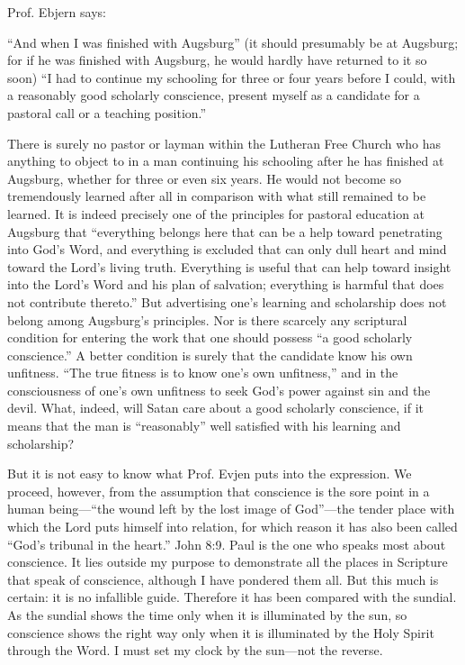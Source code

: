 Prof. Ebjern says:

“And when I was finished with Augsburg” (it should presumably be at Augsburg; for if he was finished with Augsburg, he would hardly have returned to it so soon) “I had to continue my schooling for three or four years before I could, with a reasonably good scholarly conscience, present myself as a candidate for a pastoral call or a teaching position.”

There is surely no pastor or layman within the Lutheran Free Church who has anything to object to in a man continuing his schooling after he has finished at Augsburg, whether for three or even six years. He would not become so tremendously learned after all in comparison with what still remained to be learned. It is indeed precisely one of the principles for pastoral education at Augsburg that “everything belongs here that can be a help toward penetrating into God’s Word, and everything is excluded that can only dull heart and mind toward the Lord’s living truth. Everything is useful that can help toward insight into the Lord’s Word and his plan of salvation; everything is harmful that does not contribute thereto.” But advertising one’s learning and scholarship does not belong among Augsburg’s principles. Nor is there scarcely any scriptural condition for entering the work that one should possess “a good scholarly conscience.” A better condition is surely that the candidate know his own unfitness. “The true fitness is to know one’s own unfitness,” and in the consciousness of one’s own unfitness to seek God’s power against sin and the devil. What, indeed, will Satan care about a good scholarly conscience, if it means that the man is “reasonably” well satisfied with his learning and scholarship?

But it is not easy to know what Prof. Evjen puts into the expression. We proceed, however, from the assumption that conscience is the sore point in a human being—“the wound left by the lost image of God”—the tender place with which the Lord puts himself into relation, for which reason it has also been called “God’s tribunal in the heart.” John 8:9. Paul is the one who speaks most about conscience. It lies outside my purpose to demonstrate all the places in Scripture that speak of conscience, although I have pondered them all. But this much is certain: it is no infallible guide. Therefore it has been compared with the sundial. As the sundial shows the time only when it is illuminated by the sun, so conscience shows the right way only when it is illuminated by the Holy Spirit through the Word. I must set my clock by the sun—not the reverse.


